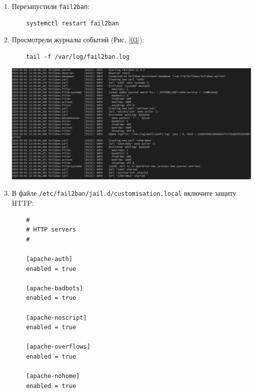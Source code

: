 \begin{enumerate}
\begin{itemize}
  \item включили защиту SSH:
\begin{verbatim}
      [sshd]
      port = ssh,2022
      enabled = true

      [sshd-dos]
      filter = sshd
      enabled = true

      [selinux-ssh]
      enabled = true
\end{verbatim}
  \end{itemize}

\item Перезапустили {\tt fail2ban}:
\begin{verbatim}
    systemctl restart fail2ban
\end{verbatim}

\item Просмотрели журналы событий (Рис. \ref{03}):
\begin{verbatim}
    tail -f /var/log/fail2ban.log
\end{verbatim}


  \begin{center}
    \centering
    \includegraphics[width=\textwidth]{../images/image03.png}
    \label{03}
  \end{center}

\item В файле {\tt /etc/fail2ban/jail.d/customisation.local} включите защиту HTTP:
\begin{verbatim}
    #
    # HTTP servers
    #

    [apache-auth]
    enabled = true

    [apache-badbots]
    enabled = true

    [apache-noscript]
    enabled = true

    [apache-overflows]
    enabled = true

    [apache-nohome]
    enabled = true


\end{verbatim}
\end{enumerate}
